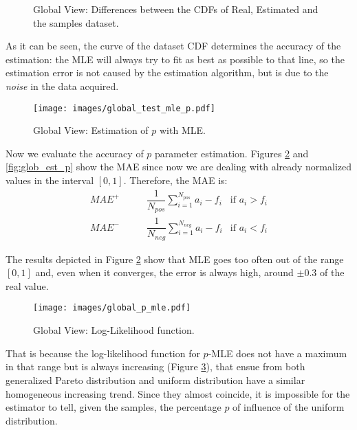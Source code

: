 \begin{figure}[!htbp]
	\centering
	\caption{Global View: Differences between the \acp{CDF} of Real, Estimated and the samples dataset.}
	\label{fig:glob_est_diff}
\end{figure}

As it can be seen, the curve of the dataset \ac{CDF} determines the accuracy of the estimation: the \ac{MLE} will always try to fit as best as possible to that line, so the estimation error is not caused by the estimation algorithm, but is due to the \textit{noise} in the data acquired.

\begin{figure}[!htbp]
	\begin{center}
		\texttt{[image: images/global\_test\_mle\_p.pdf]}
	\end{center}
	\caption{Global View: Estimation of $p$ with MLE.}
	\label{fig:glob_est_p_mle}
\end{figure}

Now we evaluate the accuracy of $p$ parameter estimation. Figures \ref{fig:glob_est_p_mle} and \ref{fig:glob_est_p} show the \ac{MAE} since now we are dealing with already normalized values in the interval $[0,1]$. Therefore, the \ac{MAE} is:
\begin{align}
	MAE^+ \quad \quad & \dfrac{1}{N_{pos}} \sum_{i = 1}^{N_{pos}} a_i - f_i & \text{if } a_i > f_i \\
	MAE^- \quad \quad & \dfrac{1}{N_{neg}} \sum_{i = 1}^{N_{neg}} a_i - f_i & \text{if } a_i < f_i
\end{align}

The results depicted in Figure \ref{fig:glob_est_p_mle} show that \ac{MLE} goes too often out of the range $[0,1]$ and, even when it converges, the error is always high, around $\pm 0.3$ of the real value.

 \begin{figure}[!htbp]
	\begin{center}
		\texttt{[image: images/global\_p\_mle.pdf]}
	\end{center}
	\caption{Global View: Log-Likelihood function.}
	\label{fig:glob_p_mle}
\end{figure}

That is because the log-likelihood function for $p$-\ac{MLE} does not have a maximum in that range but is always increasing (Figure \ref{fig:glob_p_mle}), that ensue from both generalized Pareto distribution and uniform distribution have a similar homogeneous increasing trend. Since they almost coincide, it is impossible for the estimator to tell, given the samples, the percentage $p$ of influence of the uniform distribution.

